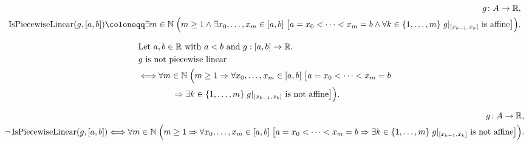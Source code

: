 \begin{remark*}
\[
\begin{aligned}
  g\colon A\to\mathbb{R},\\
\operatorname{IsPiecewiseLinear}(g,[a,b]) \coloneqq
\exists m \in \mathbb{N}\;\Bigl(m \ge 1 \land
\exists x_0,\ldots,x_m \in [a,b]\;
\bigl[a=x_0 < \cdots < x_m = b \land
\forall k \in \{1,\ldots,m\}\; g|_{[x_{k-1},x_k]} \text{ is affine}\bigr]\Bigr).
\end{aligned}
\]
\end{remark*}

\begin{remark*}
\[
\begin{aligned}
&\text{Let } a,b \in \mathbb{R} \text{ with } a<b \text{ and } g:[a,b]\to\mathbb{R}.\\
&g \text{ is not piecewise linear}\\
&\Longleftrightarrow
\forall m \in \mathbb{N}\;\Bigl(m \ge 1 \Rightarrow
\forall x_0,\ldots,x_m \in [a,b]\;
\bigl[a=x_0 < \cdots < x_m = b\\
&\qquad\qquad\Rightarrow
\exists k \in \{1,\ldots,m\}\; g|_{[x_{k-1},x_k]} \text{ is not affine}\bigr]\Bigr).
\end{aligned}
\]
\end{remark*}

\begin{remark*}
\[
\begin{aligned}
  g\colon A\to\mathbb{R},\\
\neg\operatorname{IsPiecewiseLinear}(g,[a,b])
\Longleftrightarrow
\forall m \in \mathbb{N}\;\Bigl(m \ge 1 \Rightarrow
\forall x_0,\ldots,x_m \in [a,b]\;
\bigl[a=x_0 < \cdots < x_m = b
\Rightarrow
\exists k \in \{1,\ldots,m\}\; g|_{[x_{k-1},x_k]} \text{ is not affine}\bigr]\Bigr).
\end{aligned}
\]
\end{remark*}

